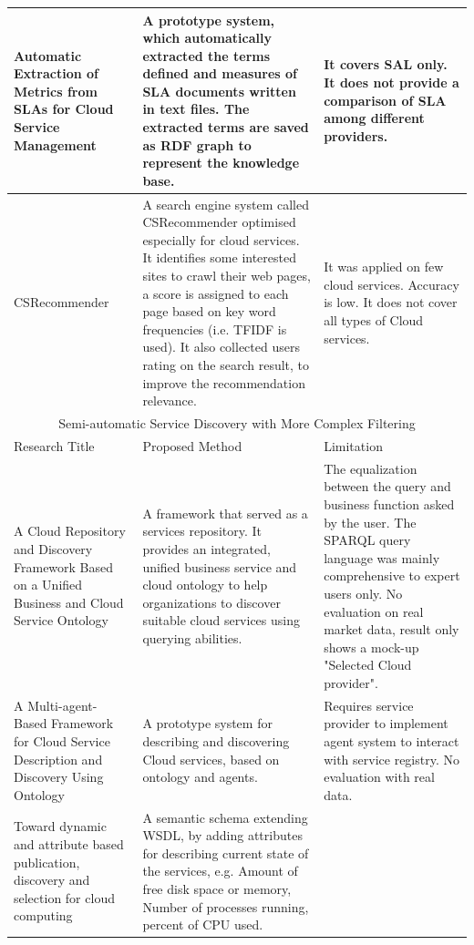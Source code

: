 \begin{longtable}{ p{30mm} | p{50mm} | p{50mm} }
\hline
	Automatic Extraction of Metrics from SLAs for Cloud Service Management \cite{AutoExtractionSLA}&
    A prototype system, which automatically extracted the terms defined and measures of SLA documents written in text files. The extracted terms are saved as RDF graph to represent the knowledge base. &
    It covers SAL only. It does not provide a comparison of SLA among different providers.\\
\hline
	CSRecommender \cite{CSRecommender}&
    A search engine system called CSRecommender optimised especially for cloud services. It identifies some interested sites to crawl their web pages,
    a score is assigned to each page based on key word frequencies (i.e. TFIDF is used). It also collected users rating on the search result, to improve the recommendation relevance.&
    It was applied on few cloud services. Accuracy is low. It does not cover all types of Cloud services.\\
\hline
\multicolumn{3}{c}{\cellcolor{yellow} Semi-automatic Service Discovery with More Complex Filtering}\\
\hline
Research Title & Proposed Method & Limitation \\
\hline
	A Cloud Repository and Discovery Framework Based on a Unified Business and Cloud Service Ontology \cite{CloudRepositoryDiscoveryFrameworkBasedonOntology}&
    A framework that served as a services repository. It provides an integrated, unified business service and cloud ontology to help organizations to discover suitable cloud services using querying abilities. &
    The equalization between the query and business function asked by the user. The SPARQL query language was mainly comprehensive to expert users only. No evaluation on real market data, result only shows a mock-up "Selected Cloud provider".\\
\hline
    A Multi-agent-Based Framework for Cloud Service Description and Discovery Using Ontology \cite{Multi-agent-BasedCloudDescriptionDiscoveryOntology}&
    A prototype system for describing and discovering Cloud services, based on ontology and agents.&
    Requires service provider to implement agent system to interact with service registry. No evaluation with real data.\\
\hline
	Toward dynamic and attribute based publication, discovery and selection for cloud computing \cite{DynamicAttributeBasedPublicationDiscoverySelectionForCloud} &
    A semantic schema extending WSDL, by adding attributes for describing current state of the services, e.g. Amount of free disk space or memory, Number of processes running, percent of CPU used. &

\end{longtable}
